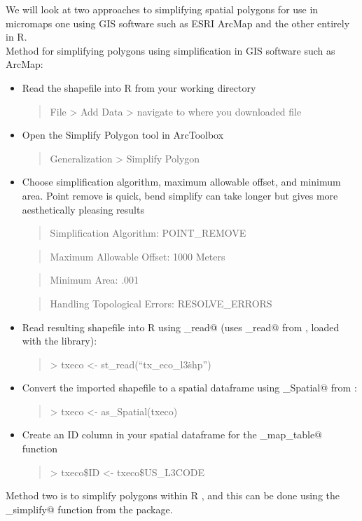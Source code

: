 \documentclass{article}
\newcommand{\R}{{\normalfont\textsf{R }}{}}
\begin{document}
We will look at two approaches to simplifying spatial polygons for use in micromaps \textemdash one using GIS software such as ESRI ArcMap and the other entirely in R.\\
Method for simplifying polygons using simplification in GIS software such as ArcMap:
\begin{itemize}
  \item Read the shapefile into R from your working directory
  \begin{quote}File > Add Data > navigate to where you downloaded file\end{quote}
  \item Open the Simplify Polygon tool in ArcToolbox
  \begin{quote}Generalization > Simplify Polygon\end{quote}
  \item Choose simplification algorithm, maximum allowable offset, and minimum area. Point remove is quick, bend simplify can take longer but gives more aesthetically pleasing results
  \begin{quote}Simplification Algorithm: POINT\_REMOVE\end{quote} 
  \begin{quote}Maximum Allowable Offset: 1000 Meters\end{quote}
  \begin{quote}Minimum Area: .001\end{quote}
  \begin{quote}Handling Topological Errors: RESOLVE\_ERRORS\end{quote} 
  \item Read resulting shapefile into \R using \verb@st_read@ (uses \verb@st_read@ from \verb@sf@, loaded with the \verb@micromap@ library):
  \begin{quote}> txeco <- st\_read(``tx\_eco\_l3\.shp'')\end{quote}
  \item Convert the imported shapefile to a spatial dataframe using \verb@as_Spatial@ from \verb@sf@:
  \begin{quote}> txeco <- as\_Spatial(txeco)\end{quote}
  \item Create an ID column in your spatial dataframe for the \verb@create_map_table@ function
  \begin{quote}> txeco\$ID <- txeco\$US\_L3CODE\end{quote}
  \end{itemize}
Method two is to simplify polygons within \R, and this can be done using the \verb@st_simplify@ function from the \verb@sf@ package.  
\end{document}
